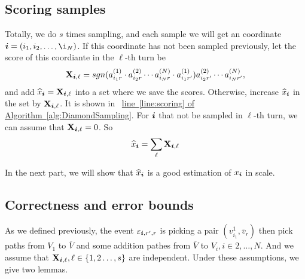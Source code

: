 \documentclass{article}
\newcommand{\Sca}[3]{{#1}^{(#2)}_{i_#2#3}}%
\newcommand{\V}[1]{{\bm{{\MakeLowercase{#1}}}}}%
\newcommand{\M}[1]{{\bm{\mathbf{\MakeUppercase{#1}}}}}%
\newcommand{\AlgLine}[2]{\hyperref[alg:#1]{line~\ref*{line:#2} of Algorithm~\ref*{alg:#1}}}
\begin{document}
\subsection{Scoring samples}

Totally, we do $s$ times sampling, and each sample we will get an coordinate $\V{i} = (i_1,i_2,\ldots,\i_N) $. If this coordinate has not been sampled previously, let the score of this coordiante in the $\ell $-th turn be
\[
\M{X}_{\V{i},\ell}  = sgn(\Sca{a}{1}{r}\cdot\Sca{a}{2}{r}\cdots\Sca{a}{N}{r}\cdot\Sca{a}{1}{r'}) \Sca{a}{2}{r'}\cdots\Sca{a}{N}{r'},
\]
and add $\widehat{x}_{\V{i}} = \M{X}_{\V{i},\ell}$ into a set where we save the scores. Otherwise, increase $\widehat{x}_{\V{i}}$ in the set by $\M{X}_{\V{i},\ell}$. It is shown in ~\AlgLine{DiamondSampling}{scoring}. For $\V{i}$ that not be sampled in $\ell$-th turn, we can assume that $\M{X}_{\V{i},\ell}=0$. So
\[
\widehat{x}_{\V{i}} = \sum_{\ell} \M{X}_{\V{i},\ell}
\]

In the next part, we will show that $\widehat{x}_{\V{i}}$ is a good estimation of $x_{\V{i}}$ in scale.

\subsection{Correctness and error bounds}

As we defined previously, the event $\varepsilon_{\V{i},r',r}$ is picking a pair $(v^1_{i_1},\overline{v}_r)$ then pick paths from $V_1$ to $\overline{V}$ and some addition pathes from $\overline{V}$ to $V_i,i\in{2,\ldots,N}$. And we assume that $\M{X}_{\V{i},\ell},\ell\in\{1,2\ldots,s\}$ are independent. Under these assumptions, we give two lemmas.
\end{document}
